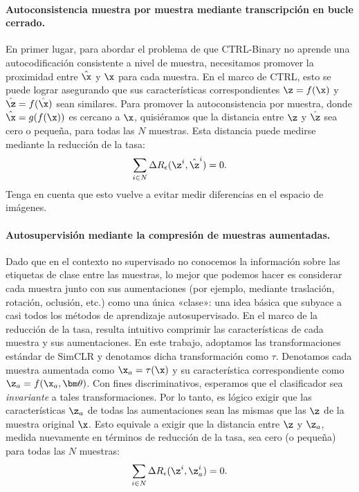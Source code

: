 \documentclass[../../book-main_es.tex]{subfiles}
\begin{document}
\paragraph{Autoconsistencia muestra por muestra mediante transcripción en bucle cerrado.}
En primer lugar, para abordar el problema de que CTRL-Binary no aprende una
autocodificación consistente a nivel de muestra, necesitamos promover la proximidad entre $\hat \x$
y $\x$ para cada muestra. En el marco de CTRL, esto se puede
lograr asegurando que sus características correspondientes $\z=f(\x)$ y
$\hat \z = f(\hat \x)$ sean similares.
Para promover la autoconsistencia por muestra, donde $\hat{\x} = g(f(\x))$
es cercano a $\x$, quisiéramos que la distancia entre $\z$ y $\hat{\z}$
sea cero o pequeña, para todas las $N$ muestras.
Esta distancia puede medirse mediante la reducción de la tasa:
\begin{align}
    \sum_{i\in N} \Delta R_\epsilon(\z^i,\hat{\z}^i) = 0.
    \label{eqn:sample-self-consistency}\vspace{-2mm}
\end{align}
Tenga en cuenta que esto vuelve a evitar medir diferencias en el espacio de imágenes.

\paragraph{Autosupervisión mediante la compresión de muestras aumentadas.}
Dado que en el contexto no supervisado no conocemos la información sobre las etiquetas de clase entre las muestras,
lo mejor que podemos hacer es considerar cada muestra
junto con sus aumentaciones (por ejemplo, mediante traslación, rotación, oclusión,
etc.) como una única «clase»: una idea básica que subyace a casi todos los métodos de aprendizaje 
autosupervisado. En el marco de la reducción de la tasa, resulta intuitivo
comprimir las características de cada muestra y sus aumentaciones. En este
trabajo, adoptamos las transformaciones estándar de SimCLR
\cite{chen2020simple} y denotamos dicha transformación como $\tau$. Denotamos
cada muestra aumentada como $\x_a = \tau(\x)$ y su característica
correspondiente como $\z_a = f(\x_a, \bm \theta)$. Con fines discriminativos,
esperamos que el clasificador sea {\em invariante} a tales
transformaciones. Por lo tanto, es lógico exigir que las características
$\z_a$ de todas las aumentaciones sean las mismas que las $\z$ de la
muestra original $\x$. Esto equivale a exigir que la distancia
entre $\z$ y $\z_a$, medida nuevamente en términos de reducción de la tasa,
sea cero (o pequeña) para todas las $N$ muestras:
\begin{align}
    \sum_{i\in N} \Delta R_\epsilon(\z^i,\z_{a}^i) = 0.
    \label{eqn:sample-compression}\vspace{-3mm}
\end{align}
\end{document}
